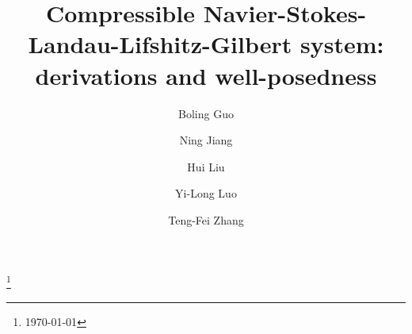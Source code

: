 \documentclass[reqno,11pt]{amsart}
\numberwithin{equation}{section}
\begin{document}
\title[Compressible NSLLG system]{Compressible Navier-Stokes-Landau-Lifshitz-Gilbert system: derivations and well-posedness}


\author[B. L. Guo]{Boling Guo}
\address[Boling Guo]{\newline   Institute of Applied Physics and Computational Mathematics in Beijing, P.O. Box 8009, Beijing
	100088, China}

\author[N. Jiang]{Ning Jiang}
\address[Ning Jiang]{\newline School of Mathematics and Statistics, Wuhan University, Wuhan, 430072, P. R. China}

\author[H. Liu]{Hui Liu}
\address[Hui Liu]
{\newline School of Finance and Mathematics, Huainan Normal University, Huainan 232038, P. R. China}


\author[Y.-L. Luo]{Yi-Long Luo}
\address[Yi-Long Luo]
{\newline School of Mathematics, Hunan University, Changsha 410082, P. R. China}

\author[T.-F. Zhang]{Teng-Fei Zhang}
\address[Teng-Fei Zhang]{\newline School of Mathematics and Physics, China University of Geosciences, Wuhan, 430074, P. R. China}


\thanks{\today}

\maketitle
\end{document}
